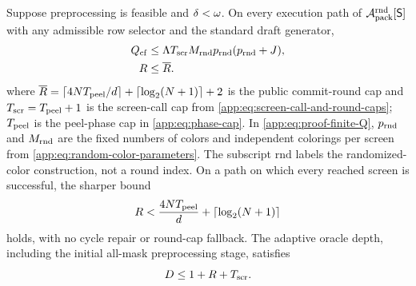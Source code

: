 \begin{lemma}
\label{app:lem:upper-resources}
Suppose preprocessing is feasible and
$\delta<\omega$.  On every execution path of
$\mathcal A_{\mathrm{pack}}^{\mathrm{rnd}}[\mathsf S]$ with any admissible row selector and the standard draft generator,
\begin{align}
 Q_{\mathrm{cf}}
 &\le\Lambda T_{\mathrm{scr}}M_{\mathrm{rnd}}
       p_{\mathrm{rnd}}(p_{\mathrm{rnd}}+J),
 \label{app:eq:proof-finite-Q}\\
 R
 &\le\overline R.
 \label{app:eq:proof-finite-R}
\end{align}
where
$\overline R=\lceil4NT_{\mathrm{peel}}/d\rceil
+\lceil\log_2(N+1)\rceil+2$ is the public commit-round cap and
$T_{\mathrm{scr}}=T_{\mathrm{peel}}+1$ is the screen-call cap from
\eqref{app:eq:screen-call-and-round-caps};
$T_{\mathrm{peel}}$ is the peel-phase cap in \eqref{app:eq:phase-cap}.
In \eqref{app:eq:proof-finite-Q}, $p_{\mathrm{rnd}}$ and
$M_{\mathrm{rnd}}$ are the fixed numbers of colors and independent
colorings per screen from \eqref{app:eq:random-color-parameters}.
The subscript $\mathrm{rnd}$ labels the randomized-color construction,
not a round index.
On a path on which every reached screen is successful, the sharper bound
\begin{equation}
 R
 <\frac{4NT_{\mathrm{peel}}}{d}
   +\left\lceil\log_2(N+1)\right\rceil
 \label{app:eq:successful-path-rounds}
\end{equation}
holds, with no cycle repair or round-cap fallback.
The adaptive oracle depth, including the initial all-mask preprocessing
stage, satisfies
\begin{equation}
 D\le1+R+T_{\mathrm{scr}}.
 \label{app:eq:finite-oracle-depth}
\end{equation}
\end{lemma}

